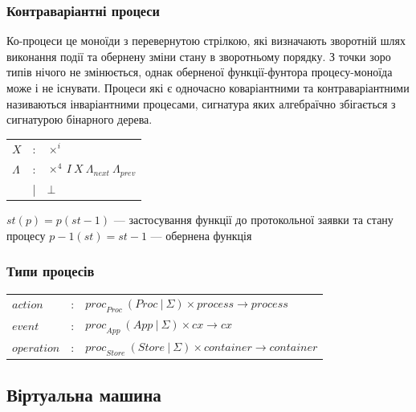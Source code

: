 \documentclass[11pt,oneside]{article}
\begin{document}
  \subsubsection*{Контраваріантні процеси}

  Ко-процеси це моноїди з перевернутою стрілкою, які визначають зворотній шлях виконання
  події та обернену зміни стану в зворотньому порядку. З точки зоро типів нічого не змінюється,
  однак оберненої функції-фунтора процесу-моноїда може і не існувати. Процеси які є
  одночасно коваріантними та контраваріантними називаються інваріантними процесами, сигнатура яких
  алгебраїчно збігається з сигнатурою бінарного дерева.

\begin{center}
\begin{tabular}{lcl}
$X$         &:& $\times^{i}$ \\
$\Lambda$   &:& $\times^{4} \ I \ X \ \Lambda_{next} \ \Lambda_{prev}$ \\
            &|& $\bot$ \\
\end{tabular}
\end{center}

\begin{center}
$st(p) = p(st-1)$ — застосування функції до протокольної заявки та стану процесу
$p-1(st) = st-1$ — обернена функція
\end{center}

  \subsubsection*{Типи процесів}

\begin{center}
\begin{tabular}{lll}
         $action$ &:& ${proc}_{Proc}\ (Proc\ |\ \Sigma) \times process \rightarrow process$ \\
         $event$  &:& ${proc}_{App}\ (App\ |\ \Sigma) \times cx \rightarrow cx$ \\
         $operation$    &:& ${proc}_{Store}\ (Store\ |\ \Sigma) \times container \rightarrow container$ \\
\end{tabular}
\end{center}

\newpage

\subsection*{Віртуальна машина}
\end{document}
